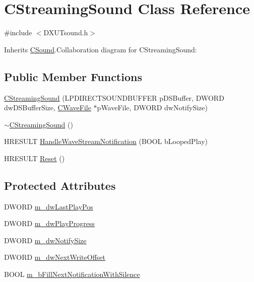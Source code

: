 \hypertarget{class_c_streaming_sound}{
\section{CStreamingSound Class Reference}
\label{class_c_streaming_sound}
}


{\ttfamily \#include $<$DXUTsound.h$>$}

Inherits \hyperlink{class_c_sound}{CSound}.Collaboration diagram for CStreamingSound:\subsection*{Public Member Functions}
\begin{DoxyCompactItemize}
\item 
\hyperlink{class_c_streaming_sound_a7fa3961eff8e78fdb5dd8c6740f472df}{CStreamingSound} (LPDIRECTSOUNDBUFFER pDSBuffer, DWORD dwDSBufferSize, \hyperlink{class_c_wave_file}{CWaveFile} $\ast$pWaveFile, DWORD dwNotifySize)
\item 
\hyperlink{class_c_streaming_sound_a47348b6fc069a98edf2a9e86bcf6b348}{$\sim$CStreamingSound} ()
\item 
HRESULT \hyperlink{class_c_streaming_sound_a86f319f40957fb309f9e5eda99186a75}{HandleWaveStreamNotification} (BOOL bLoopedPlay)
\item 
HRESULT \hyperlink{class_c_streaming_sound_a566d5512e22de66e7cfbab17784335cf}{Reset} ()
\end{DoxyCompactItemize}
\subsection*{Protected Attributes}
\begin{DoxyCompactItemize}
\item 
DWORD \hyperlink{class_c_streaming_sound_a3f94f44e925644eeb62452486cd02426}{m\_\-dwLastPlayPos}
\item 
DWORD \hyperlink{class_c_streaming_sound_a35cb3a07748cac48d75cef69ceafa476}{m\_\-dwPlayProgress}
\item 
DWORD \hyperlink{class_c_streaming_sound_a073ea54d4aa5ade06dd00f75cb0e07cd}{m\_\-dwNotifySize}
\item 
DWORD \hyperlink{class_c_streaming_sound_a89acb4aad3668f834de1839c3a392862}{m\_\-dwNextWriteOffset}
\item 
BOOL \hyperlink{class_c_streaming_sound_ab229235758b70b36c2e1aeb3d877678c}{m\_\-bFillNextNotificationWithSilence}
\end{DoxyCompactItemize}


